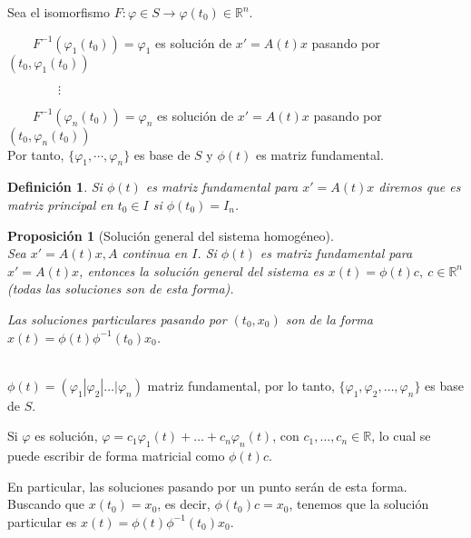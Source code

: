 \documentclass{article}
\makeatletter
\theoremstyle{theorem-style}  %
\newtheorem{proposition}[theorem]{Proposición}
\theoremstyle{definition-style}
\newtheorem{definition}{Definición}[section]
\theoremstyle{example-style}
\renewenvironment{proof}[1][\proofname]{\par
	\pushQED{\qed}%
	\normalfont \topsep6\p@\@plus6\p@\relax
	\list{}{%
		\settowidth{\leftmargin}{\quad:\hskip\labelsep}%
		\setlength{\labelwidth}{0pt}%
		\setlength{\itemindent}{-\leftmargin}%
	}%
	\item[\hskip\labelsep\itshape#1\@addpunct{:}]\ignorespaces
}{%
	\popQED\endlist\@endpefalse
}
\makeatother
\begin{document}
\begin{proof}
\begin{enumerate}
	Sea el isomorfismo $ F:\varphi\in S\longrightarrow \varphi(t_0)\in \mathbb{R}^n $. 
	
	$ \qquad F^{-1}(\varphi_1(t_0))=\varphi_1 $ es solución de $ x'=A(t)x $ pasando por $ (t_0,\varphi_1(t_0)) $ 
	
	$ \qquad \qquad \vdots $ 
	
	$ \qquad F^{-1}(\varphi_n(t_0))=\varphi_n $ es solución de $ x'=A(t)x $ pasando por $ (t_0,\varphi_n(t_0)) $ \\
	Por tanto, $ \{ \varphi_1, \cdots, \varphi_n \} $ es base de $ S $ y $ \phi(t) $ es matriz fundamental. 
	\end{enumerate}
\end{proof}
\begin{definition}
	Si $ \phi(t) $ es matriz fundamental para $ x'=A(t)x $ diremos que es \emph{matriz principal en $ t_0$}$\in I $ si $ \phi(t_0)=I_n $.
\end{definition}
\begin{proposition}[Solución general del sistema homogéneo] \ \\
	Sea $ x'= A(t)x, A$ continua en $ I $. Si $ \phi(t) $ es matriz fundamental para $ x'=A(t)x $, entonces la solución general del sistema es $ x(t)=\phi(t)c, \ c\in \mathbb{R}^n $ (todas las soluciones son de esta forma).	
	
	Las soluciones particulares pasando por $ (t_0,x_0) $ son de la forma  $ x(t)=\phi(t)\phi^{-1}(t_0)x_0 $.
\end{proposition}
\begin{proof}\ \\
	$ \phi(t)= (\varphi_1 | \varphi_2 | \dots | \varphi_n) $ matriz fundamental, por lo tanto, $ \{\varphi_1, \varphi_2, \dots,  \varphi_n \} $ es base de $ S $.
	
	Si $ \varphi $ es solución, $ \varphi = c_1\varphi_1(t)+ \dots + c_n \varphi_n(t) $, con $ c_1, \dots, c_n\in \mathbb{R} $, lo cual se puede escribir de forma matricial como $ \phi(t)c $.
	
	En particular, las soluciones pasando por un punto serán de esta forma. Buscando que $ x(t_0)=x_0 $, es decir, $ \phi(t_0)c=x_0 $, tenemos que la solución particular es $ x(t)=\phi(t)\phi^{-1}(t_0)x_0 $.
\end{proof}
\end{document}
